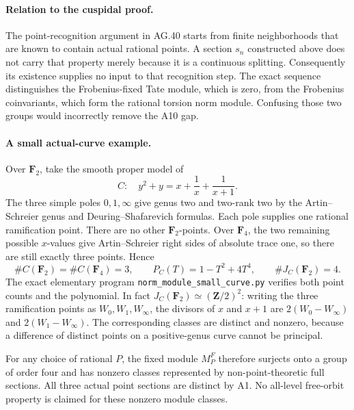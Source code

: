 \paragraph{Relation to the cuspidal proof.}
The point-recognition argument in AG.40 starts from
finite neighborhoods that are known to contain
actual rational points. A section $s_n$ constructed
above does not carry that property merely because
it is a continuous splitting. Consequently its
existence supplies no input to that recognition
step. The exact sequence distinguishes the
Frobenius-fixed Tate module, which is zero, from
the Frobenius coinvariants, which form the
rational torsion norm module. Confusing those two
groups would incorrectly remove the A10 gap.

\paragraph{A small actual-curve example.}
Over $\mathbf F_2$, take the smooth proper model of
\[
                   C:\quad y^2+y=x+\frac1x+\frac1{x+1}.
                                                        \tag{AC.45.9}
\]
The three simple poles $0,1,\infty$ give genus two
and two-rank two by the Artin--Schreier genus and
Deuring--Shafarevich formulas. Each pole supplies
one rational ramification point. There are no
other $\mathbf F_2$-points. Over $\mathbf F_4$,
the two remaining possible $x$-values give
Artin--Schreier right sides of absolute trace one,
so there are still exactly three points. Hence
\[
 \#C(\mathbf F_2)=\#C(\mathbf F_4)=3,
 \qquad P_C(T)=1-T^2+4T^4,
 \qquad \#J_C(\mathbf F_2)=4.
                                                        \tag{AC.45.10}
\]
The exact elementary program
\texttt{norm\_module\_small\_curve.py} verifies
both point counts and the polynomial. In fact
$J_C(\mathbf F_2)\simeq(\mathbf Z/2)^2$:
writing the three ramification points as
$W_0,W_1,W_\infty$, the divisors of $x$ and
$x+1$ are $2(W_0-W_\infty)$ and
$2(W_1-W_\infty)$. The corresponding classes
are distinct and nonzero, because a difference
of distinct points on a positive-genus curve
cannot be principal.

For any choice of rational $P$, the fixed module
$M_P^F$ therefore surjects onto a group of order
four and has nonzero classes represented by
non-point-theoretic full sections. All three
actual point sections are distinct by A1.
No all-level free-orbit property is claimed for
these nonzero module classes.


